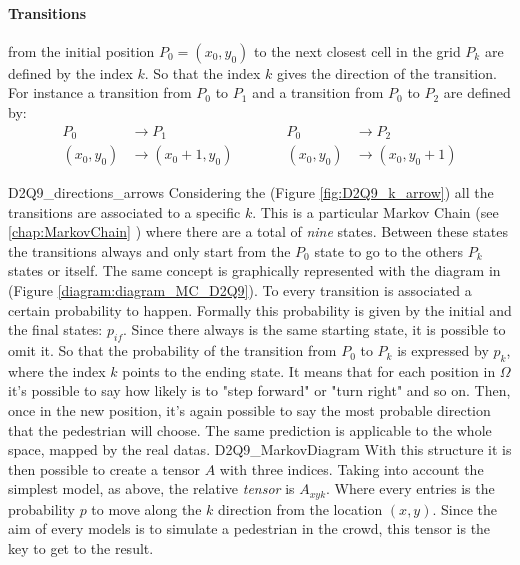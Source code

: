 \documentclass[class=article, crop=false]{standalone}
\begin{document}
\paragraph{Transitions} from the initial position $P_0=(x_0, y_0)$ to the next closest cell in the grid $P_k$ are defined by the index $k$.
So that the index $k$ gives the direction of the transition.
For instance a transition from $P_0$ to $P_1$ and a transition from $P_0$ to $P_2$ are defined by:
\begin{equation*}
\begin{split}
P_0 &\to P_1 \\
(x_0, y_0) &\to (x_0+1, y_0)
\end{split}\quad\quad\quad
\begin{split}
P_0 &\to P_2 \\
(x_0, y_0) &\to (x_0, y_0+1)
\end{split}
\end{equation*}

{D2Q9_directions_arrows}
Considering the (Figure \ref{fig:D2Q9_k_arrow}) all the transitions are associated to a specific $k$.
This is a particular Markov Chain (see \ref{chap:MarkovChain} ) where there are a total of \emph{nine} states.
Between these states the transitions always and only start from the $P_0$ state to go to the others $P_k$ states or itself.
The same concept is graphically represented with the diagram in (Figure \ref{diagram:diagram_MC_D2Q9}).
To every transition is associated a certain probability to happen.
Formally this probability is given by the initial and the final states: $p_{if}$.
Since there always is the same starting state, it is possible to omit it.
So that the probability of the transition from $P_0$ to $P_k$ is expressed by $p_k$, where the index $k$ points to the ending state.
It means that for each position in $\Omega$ it's possible to say how likely is to "step forward" or "turn right" and so on.
Then, once in the new position, it's again possible to say the most probable direction that the pedestrian will choose.
The same prediction is applicable to the whole space, mapped by the real datas.
{D2Q9_MarkovDiagram}
With this structure it is then possible to create a tensor $A$ with three indices.
Taking into account the simplest model, as above, the relative \emph{tensor} is $A_{x y k}$.
Where every entries is the probability $p$ to move along the $k$ direction from the location $(x, y)$.
Since the aim of every models is to simulate a pedestrian in the crowd, this tensor is the key to get to the result.
\end{document}
